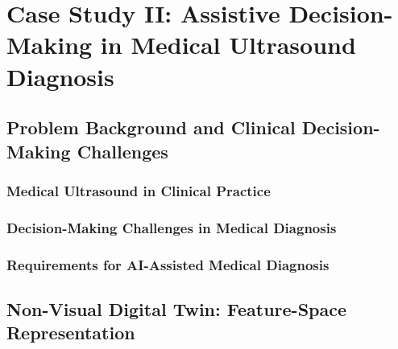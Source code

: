 
\chapter{Case Study II: Assistive Decision-Making in Medical Ultrasound Diagnosis} \label{chp:medical}


\section{Problem Background and Clinical Decision-Making Challenges}

\subsection{Medical Ultrasound in Clinical Practice}

\subsection{Decision-Making Challenges in Medical Diagnosis}

\subsection{Requirements for AI-Assisted Medical Diagnosis}

\section{Non-Visual Digital Twin: Feature-Space Representation}

